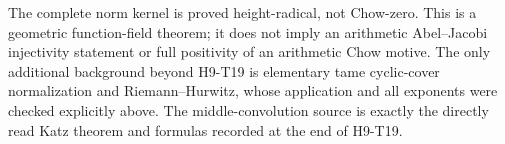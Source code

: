 The complete norm kernel is proved height-radical, not
Chow-zero. This is a geometric function-field theorem; it
does not imply an arithmetic Abel--Jacobi injectivity
statement or full positivity of an arithmetic Chow motive.
The only additional background beyond H9-T19 is elementary
tame cyclic-cover normalization and Riemann--Hurwitz, whose
application and all exponents were checked explicitly above.
The middle-convolution source is exactly the directly read
Katz theorem and formulas recorded at the end of H9-T19.
